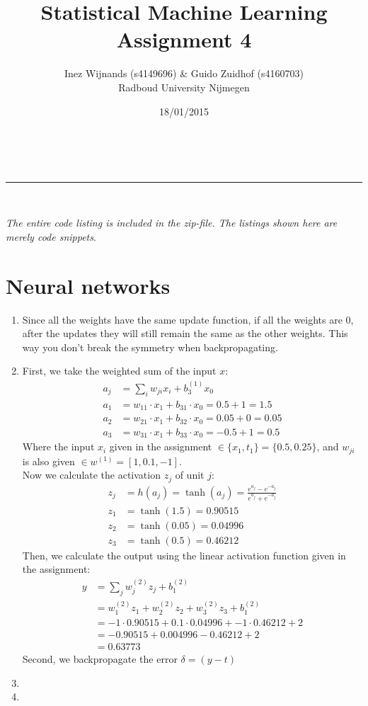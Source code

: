 \documentclass[a4paper,10pt]{article}
\makeatletter
\numberwithin{equation}{section} %
\numberwithin{figure}{section} %
\numberwithin{table}{section} %
\newcommand{\linia}{\rule{\linewidth}{0.5pt}}
\theoremstyle{mytheor}
\renewcommand{\maketitle}{
\begin{center}
\vspace{2ex}
{\huge \textsc{\@title}}
\vspace{1ex}
\\
\linia\\
\@author  \@date
\vspace{4ex}
\end{center}
}
\makeatother
\begin{document}
\title{Statistical Machine Learning \\ Assignment 4}

\author{Inez Wijnands (s4149696) \& Guido Zuidhof (s4160703)\\ Radboud University Nijmegen\\}

\date{18/01/2015}

\maketitle

\noindent \textit{The entire code listing is included in the zip-file. The listings shown here are merely code snippets}.\vspace{-0.5cm}
\section{Neural networks}
\begin{enumerate}
	\item Since all the weights have the same update function, if all the weights are $0$,  after the updates they will still remain the same as the other weights. This way you don't break the symmetry when backpropagating.
	\item First, we take the weighted sum of the input $x$:
		\begin{align*}
		a_j &= \sum_i w_{ji}x_i + b_3^{(1)} x_0\\
		a_1 &= w_{11} \cdot x_1 + b_{31} \cdot x_0 = 0.5 + 1 = 1.5\\
		a_2 &= w_{21} \cdot x_1 + b_{32} \cdot x_0 = 0.05 + 0 = 0.05 \\
		a_3 &= w_{31} \cdot x_1 + b_{33} \cdot x_0 = -0.5 + 1 = 0.5
		\end{align*}
		\noindent Where the input $x_i$ given in the assignment $\in \{x_1,t_1\} = \{0.5, 0.25\}$, and $w_{ji}$ is also given $\in w^{(1)} = [1,0.1,-1]$.\\
		Now we calculate the activation $z_j$ of unit $j$:
		\begin{align*}
		z_j &= h(a_j) = \tanh(a_j) = \frac{e^{a_j} - e^{-a_j}}{e^{a_j} + e^{-a_j}}\\
		z_1 &= \tanh(1.5) = 0.90515\\
		z_2 &= \tanh(0.05) = 0.04996\\
		z_3 &= \tanh(0.5) = 0.46212
		\end{align*}
		Then, we calculate the output using the linear activation function given in the assignment:
		\begin{align*}
		y &= \sum_j w_j^{(2)}z_j + b_1^{(2)}\\
		&= w_1^{(2)}z_1 + w_2^{(2)}z_2 + w_3^{(2)}z_3 + b_1^{(2)}\\
		&= -1 \cdot 0.90515 + 0.1 \cdot 0.04996 + -1 \cdot 0.46212 + 2\\
		&= -0.90515 + 0.004996 - 0.46212 + 2 \\
		&= 0.63773
		\end{align*}
		Second, we backpropagate the error $\delta = (y - t)$ 
	\item 
	\item 
\end{enumerate}
\end{document}
